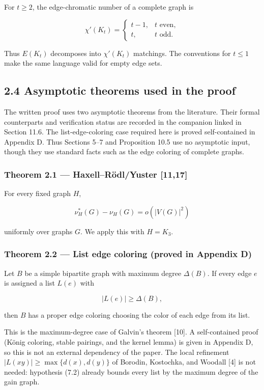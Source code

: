 \documentclass[english,11pt,a4paper]{article}
\begin{document}
For \(t\ge2\), the edge-chromatic number of a complete graph is

\[
\chi'(K_t)
=
\begin{cases}
t-1,&t\text{ even},\\
t,&t\text{ odd}.
\end{cases}
\tag{2.2}
\]

Thus \(E(K_t)\) decomposes into \(\chi'(K_t)\) matchings. The
conventions for \(t\le1\) make the same language valid for empty edge
sets.

\subsection{2.4 Asymptotic theorems used in the
proof}\label{asymptotic-theorems-used-in-the-proof}

The written proof uses two asymptotic theorems from the literature.
Their formal counterparts and verification status are recorded in the
companion linked in Section 11.6. The list-edge-coloring case required
here is proved self-contained in Appendix D. Thus Sections 5--7 and
Proposition 10.5 use no asymptotic input, though they use standard facts
such as the edge coloring of complete graphs.

\subsubsection{Theorem 2.1 --- Haxell--Rödl/Yuster
{[}11,17{]}}\label{theorem-2.1-haxellruxf6dlyuster-1117}

For every fixed graph \(H\),

\[
\nu_H^*(G)-\nu_H(G)=o(|V(G)|^2)
\]

uniformly over graphs \(G\). We apply this with \(H=K_3\).

\subsubsection{Theorem 2.2 --- List edge coloring (proved in Appendix
D)}\label{theorem-2.2-list-edge-coloring-proved-in-appendix-d}

Let \(B\) be a simple bipartite graph with maximum degree \(\Delta(B)\).
If every edge \(e\) is assigned a list \(L(e)\) with

\[
|L(e)|\ge\Delta(B),
\]

then \(B\) has a proper edge coloring choosing the color of each edge
from its list.

This is the maximum-degree case of Galvin's theorem {[}10{]}. A
self-contained proof (König coloring, stable pairings, and the kernel
lemma) is given in Appendix D, so this is not an external dependency of
the paper. The local refinement \(|L(xy)|\ge\max\{d(x),d(y)\}\) of
Borodin, Kostochka, and Woodall {[}4{]} is not needed: hypothesis (7.2)
already bounds every list by the maximum degree of the gain graph.
\end{document}
